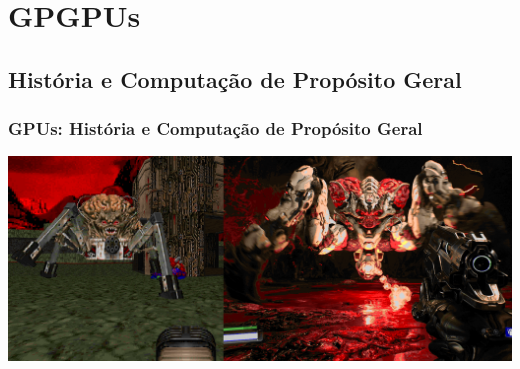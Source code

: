 \documentclass[10pt, compress]{beamer}
\begin{document}
\section{GPGPUs}

\subsection{História e Computação de Propósito Geral}

\begin{frame}
    \frametitle{GPUs: História e Computação de Propósito Geral}
    \begin{center}
        \includegraphics[width=\textwidth]{spiderdoom}
    \end{center}
\end{frame}
\end{document}

